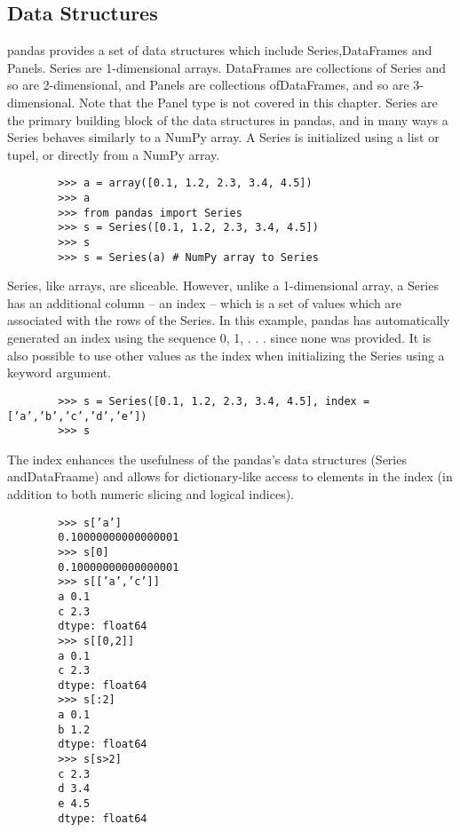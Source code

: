 \documentclass[KSmain.tex]{subfiles}
\begin{document}
	\subsection{Data Structures}
	pandas provides a set of data structures which include Series,DataFrames and Panels. Series are 1-dimensional
	arrays. DataFrames are collections of Series and so are 2-dimensional, and Panels are collections ofDataFrames,
	and so are 3-dimensional. Note that the Panel type is not covered in this chapter.
	Series are the primary building block of the data structures in pandas, and in many ways a Series behaves
	similarly to a NumPy array. A Series is initialized using a list or tupel, or directly from a NumPy array.
	\begin{framed}
		\begin{verbatim}
		>>> a = array([0.1, 1.2, 2.3, 3.4, 4.5])
		>>> a
		>>> from pandas import Series
		>>> s = Series([0.1, 1.2, 2.3, 3.4, 4.5])
		>>> s
		>>> s = Series(a) # NumPy array to Series
		\end{verbatim}
	\end{framed}
	Series, like arrays, are sliceable. However, unlike a 1-dimensional array, a Series has an additional column
	– an index – which is a set of values which are associated with the rows of the Series. In this example,
	pandas has automatically generated an index using the sequence 0, 1, . . . since none was provided. It is
	also possible to use other values as the index when initializing the Series using a keyword argument.
	\begin{framed}
		\begin{verbatim}
		>>> s = Series([0.1, 1.2, 2.3, 3.4, 4.5], index = [’a’,’b’,’c’,’d’,’e’])
		>>> s
		\end{verbatim}
	\end{framed}
	The index enhances the usefulness of the pandas’s data structures (Series andDataFraame) and allows for
	dictionary-like access to elements in the index (in addition to both numeric slicing and logical indices).
	\begin{framed}
		\begin{verbatim}
		>>> s[’a’]
		0.10000000000000001
		>>> s[0]
		0.10000000000000001
		>>> s[[’a’,’c’]]
		a 0.1
		c 2.3
		dtype: float64
		>>> s[[0,2]]
		a 0.1
		c 2.3
		dtype: float64
		>>> s[:2]
		a 0.1
		b 1.2
		dtype: float64
		>>> s[s>2]
		c 2.3
		d 3.4
		e 4.5
		dtype: float64
		\end{verbatim}
	\end{framed}
\end{document}
